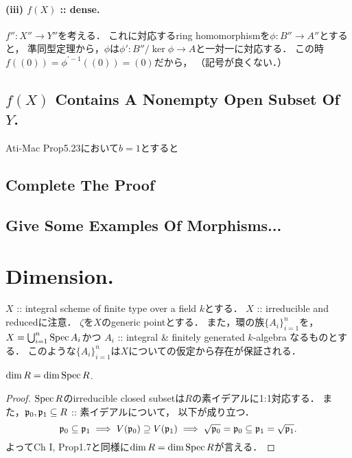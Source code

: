 \documentclass[a4paper]{jsarticle}
\begin{document}
    \paragraph{(iii) $f(X)$ :: dense.}
    $f'': X'' \to Y''$を考える．
    これに対応するring homomorphismを$\phi: B'' \to A''$とすると，
    準同型定理から，$\phi$は$\phi': B''/\ker \phi \to A$と一対一に対応する．
    この時$f((0))=\phi^{'-1}((0))=(0)$だから，
    （記号が良くない．）

    \subsection{$f(X)$ Contains A Nonempty Open Subset Of $Y$.}
    Ati-Mac Prop5.23において$b=1$とすると

    \subsection{Complete The Proof}

    \subsection{Give Some Examples Of Morphisms...}

\section{Dimension.} %
    $X$ :: integral scheme of finite type over a field $k$とする．
    $X$ :: irreducible and reducedに注意．
    $\zeta$を$X$のgeneric pointとする．
    また，環の族$\{A_i\}_{i=1}^n$を，
    $X=\bigcup_{i=1}^n \operatorname{Spec} A_i$かつ
    $A_i$ :: integral \& finitely generated $k$-algebra
    なるものとする．
    このような$\{A_i\}_{i=1}^n$は$X$についての仮定から存在が保証される．

    \begin{Claim}
        $\dim R=\dim \operatorname{Spec} R$.
    \end{Claim}
    \begin{proof}
        $\operatorname{Spec} R$のirreducible closed subsetは$R$の素イデアルに1:1対応する．
        また，$\mathfrak{p}_0, \mathfrak{p}_1 \subseteq R$ :: 素イデアルについて，
        以下が成り立つ．
        \[
            \mathfrak{p}_0 \subseteq \mathfrak{p}_1
            \implies V(\mathfrak{p}_0) \supseteq V(\mathfrak{p}_1)
            \implies \sqrt{\mathfrak{p}_0}=\mathfrak{p}_0 \subseteq \mathfrak{p}_1=\sqrt{\mathfrak{p}_1}.
        \]
        よってCh I, Prop1.7と同様に$\dim R=\dim \operatorname{Spec} R$が言える．
    \end{proof}
\end{document}

